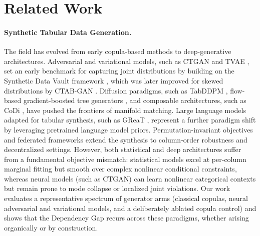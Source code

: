 \documentclass[pdflatex,sn-mathphys-num]{sn-jnl}
\theoremstyle{thmstyleone}%
\theoremstyle{thmstyletwo}%
\theoremstyle{thmstylethree}%
\begin{document}
\section{Related Work}\label{sec:related}

\paragraph{Synthetic Tabular Data Generation.} The field has evolved from early copula-based methods \cite{sklar1959, joe1996} to deep-generative architectures. Adversarial and variational models, such as CTGAN and TVAE \cite{xu2019modeling}, set an early benchmark for capturing joint distributions by building on the Synthetic Data Vault framework \cite{patki2016synthetic}, which was later improved for skewed distributions by CTAB-GAN \cite{zhao2021ctab}. Diffusion paradigms, such as TabDDPM \cite{kotelnikov2023tabddpm}, flow-based gradient-boosted tree generators \cite{jolicoeur2024generating}, and composable architectures, such as CoDi \cite{lee2023codi}, have pushed the frontiers of manifold matching. Large language models adapted for tabular synthesis, such as GReaT \cite{borisov2023language}, represent a further paradigm shift by leveraging pretrained language model priors. Permutation-invariant objectives \cite{zhu2022permutation} and federated frameworks \cite{zhao2021fedtgan} extend the synthesis to column-order robustness and decentralized settings. However, both statistical and deep architectures suffer from a fundamental objective mismatch: statistical models excel at per-column marginal fitting but smooth over complex nonlinear conditional constraints, whereas neural models (such as CTGAN) can learn nonlinear categorical contexts but remain prone to mode collapse or localized joint violations. Our work evaluates a representative spectrum of generator arms (classical copulas, neural adversarial and variational models, and a deliberately ablated copula control) and shows that the Dependency Gap recurs across these paradigms, whether arising organically or by construction.
\end{document}
